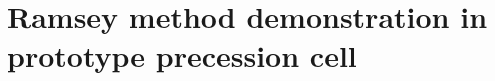 
\chapter{Ramsey method demonstration in prototype precession cell}\label{chap:lanl_ramsey_demonstration}

